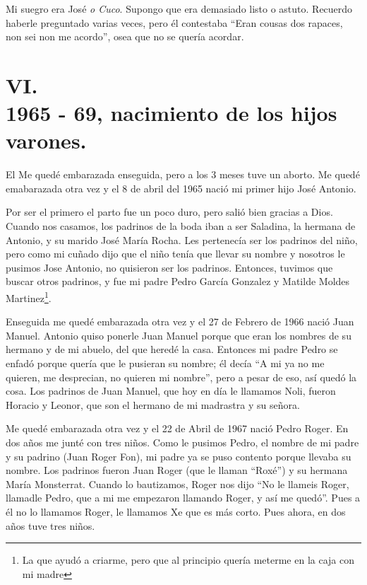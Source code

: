 \documentclass[12pt,a5paper]{book}
\begin{document}
Mi suegro era José \textit{o Cuco}. Supongo que era demasiado listo o astuto. Recuerdo haberle preguntado varias veces, pero él contestaba ``Eran cousas dos rapaces, non sei non me acordo'', osea que no se quería acordar.


\section*{VI.\\1965 - 69, nacimiento de los hijos varones.}


El Me quedé embarazada enseguida, pero a los 3 meses tuve un aborto. Me quedé emabarazada otra vez y el 8 de abril del 1965 nació mi primer hijo José Antonio.

Por ser el primero el parto fue un poco duro, pero salió bien gracias a Dios. Cuando nos casamos, los padrinos de la boda iban a ser Saladina, la hermana de Antonio, y su marido José María Rocha. Les pertenecía ser los padrinos del niño, pero como mi cuñado dijo que el niño tenía que llevar su nombre y nosotros le pusimos Jose Antonio, no quisieron ser los padrinos. Entonces, tuvimos que buscar otros padrinos, y fue mi padre Pedro García Gonzalez y Matilde Moldes Martinez\footnote{La que ayudó a criarme, pero que al principio quería meterme en la caja con mi madre}. 

Enseguida me quedé embarazada otra vez y el 27 de Febrero de 1966 nació Juan Manuel. Antonio quiso ponerle Juan Manuel porque que eran los nombres de su hermano y de mi abuelo, del que heredé la casa. Entonces mi padre Pedro se enfadó porque quería que le pusieran su nombre; él decía ``A mi ya no me quieren, me desprecian, no quieren mi nombre'', pero a pesar de eso, así quedó la cosa. Los padrinos de Juan Manuel, que hoy en día le llamamos Noli, fueron Horacio y Leonor, que son el hermano de mi madrastra y su señora.

Me quedé embarazada otra vez y el 22 de Abril de 1967 nació Pedro Roger. En dos años me junté con tres niños. Como le pusimos Pedro, el nombre de mi padre y su padrino (Juan Roger Fon), mi padre ya se puso contento porque llevaba su nombre. Los padrinos fueron Juan Roger (que le llaman “Roxé”) y su hermana María Monsterrat. Cuando lo bautizamos, Roger nos dijo ``No le llameis Roger, llamadle Pedro, que a mi me empezaron llamando Roger, y así me quedó''. Pues a él no lo llamamos Roger, le llamamos Xe que es más corto. Pues ahora, en dos años tuve tres niños.
\end{document}
